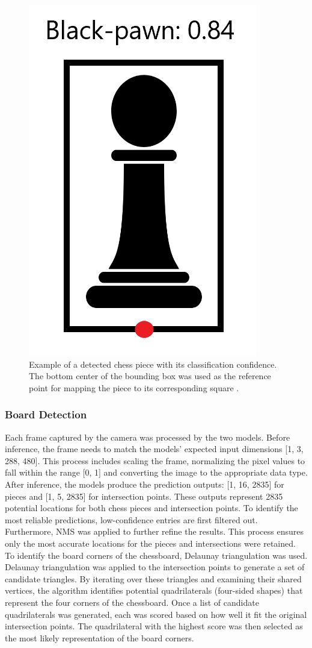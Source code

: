 

\begin{figure}[h!]
    \centering
    \includegraphics[width=0.25\linewidth]{figures/methods/ml-models/black-pawn.png}
    \caption[Detected chess piece and its bounding box]{Example of a detected chess piece with its classification confidence. The bottom center of the bounding box was used as the reference point for mapping the piece to its corresponding square \cite{svgrepo:black-pawn-svg}.}
    \label{fig:bbox-black-pawn}
\end{figure}


\subsubsection*{Board Detection}

Each frame captured by the camera was processed by the two models. Before inference, the frame needs to match the models’ expected input dimensions [1, 3, 288, 480]. This process includes scaling the frame, normalizing the pixel values to fall within the range [0, 1] and converting the image to the appropriate data type. \\

After inference, the models produce the prediction outputs: [1, 16, 2835] for pieces and [1, 5, 2835] for intersection points. These outputs represent 2835 potential locations for both chess pieces and intersection points. To identify the most reliable predictions, low-confidence entries are first filtered out. Furthermore, NMS was applied to further refine the results. This process ensures only the most accurate locations for the pieces and intersections were retained. \\

To identify the board corners of the chessboard, Delaunay triangulation was used. Delaunay triangulation was applied to the intersection points to generate a set of candidate triangles. By iterating over these triangles and examining their shared vertices, the algorithm identifies potential quadrilaterals (four-sided shapes) that represent the four corners of the chessboard. Once a list of candidate quadrilaterals was generated, each was scored based on how well it fit the original intersection points. The quadrilateral with the highest score was then selected as the most likely representation of the board corners.
\\

